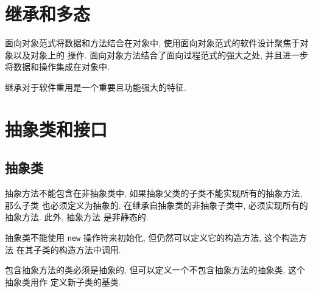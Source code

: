 \documentclass[10pt,UTF8]{book} %
\begin{document}






\chapter{继承和多态}

面向对象范式将数据和方法结合在对象中, 使用面向对象范式的软件设计聚焦于对象以及对象上的
操作. 面向对象方法结合了面向过程范式的强大之处, 并且进一步将数据和操作集成在对象中.

继承对于软件重用是一个重要且功能强大的特征.

\chapter{抽象类和接口}

\section{抽象类}

抽象方法不能包含在非抽象类中, 如果抽象父类的子类不能实现所有的抽象方法, 那么子类
也必须定义为抽象的. 在继承自抽象类的非抽象子类中, 必须实现所有的抽象方法. 此外, 抽象方法
是非静态的.

抽象类不能使用 \lstinline|new| 操作符来初始化, 但仍然可以定义它的构造方法, 这个构造方法
在其子类的构造方法中调用.

包含抽象方法的类必须是抽象的, 但可以定义一个不包含抽象方法的抽象类, 这个抽象类用作
定义新子类的基类.
\end{document}
